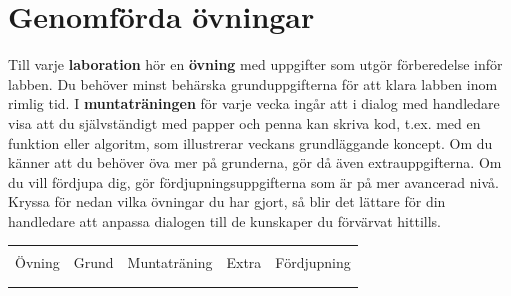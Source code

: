 
\label{progress-protocoll}


\section*{Genomförda övningar}

\vspace{1em}\noindent
{Till varje \textbf{laboration} hör en \textbf{övning} med uppgifter som utgör förberedelse inför labben. Du behöver minst behärska grunduppgifterna för att klara labben inom rimlig tid. 
I \textbf{muntaträningen} för varje vecka ingår att i dialog med handledare visa att du självständigt med papper och penna kan skriva kod, t.ex. med en funktion eller algoritm, som illustrerar veckans grundläggande koncept.
Om du känner att du behöver öva mer på grunderna, gör då även extrauppgifterna. Om du vill fördjupa dig, gör fördjupningsuppgifterna som är på mer avancerad nivå. Kryssa för nedan vilka övningar du har gjort, så blir det lättare för din handledare att anpassa dialogen till de kunskaper du förvärvat hittills.}


\newcommand{\TickBox}{\raisebox{-.50ex}{\Large$\square$}}
\newcommand{\ExeRow}[1]{\hyperref[section:exe:#1]{\texttt{#1}} & \TickBox  &  \TickBox &  \TickBox &  \TickBox  \\ } %

\begin{table}[h]
\vspace{2em}
\begin{tabular}{lcccc}
\hline \\ %
{\sffamily Övning} &
{\sffamily Grund} &
{\sffamily Muntaträning} &
{\sffamily Extra} &
{\sffamily Fördjupning}\\[1em] \hline  %
\\


\\\hline%
\end{tabular}
\end{table}

